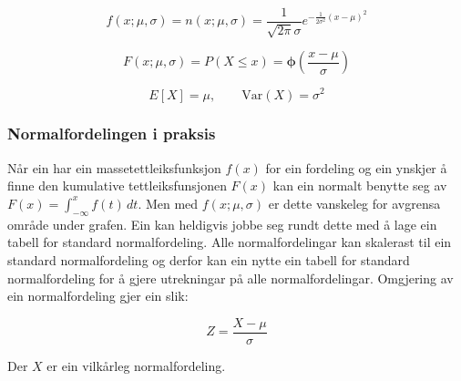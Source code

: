 \begin{equation}
    f(x; \mu, \sigma) = n(x; \mu, \sigma) = \frac{1}{\sqrt{2\pi}\sigma} e^{-\frac{1}{2\sigma^2}(x-\mu)^2}
\end{equation}

\begin{equation}
    F(x; \mu, \sigma) = P(X \leq x) = \boldsymbol{\phi}\left(\frac{x - \mu}{\sigma}\right)
\end{equation}

\begin{equation}
    E[X] = \mu, \qquad \text{Var}(X) = \sigma^2
\end{equation}

\subsubsection{Normalfordelingen i praksis}\label{chap:normpraksis}

Når ein har ein massetettleiksfunksjon $f(x)$ for ein fordeling og ein ynskjer å finne den kumulative tettleiksfunsjonen $F(x)$ kan ein normalt benytte seg av $F(x) = \int_{-\infty}^{x} f(t) \,dt$. Men med
$f(x; \mu, \sigma)$ er dette vanskeleg for avgrensa område under grafen. Ein kan heldigvis jobbe seg rundt dette med å lage ein tabell for standard normalfordeling.  Alle normalfordelingar kan skalerast til ein standard normalfordeling og derfor kan ein nytte ein tabell for standard normalfordeling for å gjere utrekningar på alle normalfordelingar. Omgjering av ein normalfordeling gjer ein slik:

\begin{equation}
    Z = \frac{X - \mu}{\sigma}
\end{equation}

Der $X$ er ein vilkårleg normalfordeling. 

